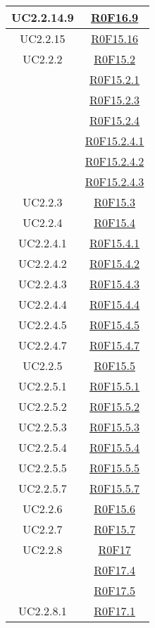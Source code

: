 \documentclass[../AnalisiDeiRequisiti.tex]{subfiles}
\begin{document}
\begin{longtable}{|c|c|}
	UC2.2.14.9 & \hyperlink{R0F16.9}{R0F16.9}\\\hline
	UC2.2.15 & \hyperlink{R0F15.16}{R0F15.16}\\\hline
	UC2.2.2 & \hyperlink{R0F15.2}{R0F15.2}\\& \hyperlink{R0F15.2.1}{R0F15.2.1}\\& \hyperlink{R0F15.2.3}{R0F15.2.3}\\& \hyperlink{R0F15.2.4}{R0F15.2.4}\\& \hyperlink{R0F15.2.4.1}{R0F15.2.4.1}\\& \hyperlink{R0F15.2.4.2}{R0F15.2.4.2}\\& \hyperlink{R0F15.2.4.3}{R0F15.2.4.3}\\\hline
	UC2.2.3 & \hyperlink{R0F15.3}{R0F15.3}\\\hline
	UC2.2.4 & \hyperlink{R0F15.4}{R0F15.4}\\\hline
	UC2.2.4.1 & \hyperlink{R0F15.4.1}{R0F15.4.1}\\\hline
	UC2.2.4.2 & \hyperlink{R0F15.4.2}{R0F15.4.2}\\\hline
	UC2.2.4.3 & \hyperlink{R0F15.4.3}{R0F15.4.3}\\\hline
	UC2.2.4.4 & \hyperlink{R0F15.4.4}{R0F15.4.4}\\\hline
	UC2.2.4.5 & \hyperlink{R0F15.4.5}{R0F15.4.5}\\\hline
	UC2.2.4.7 & \hyperlink{R0F15.4.7}{R0F15.4.7}\\\hline
	UC2.2.5 & \hyperlink{R0F15.5}{R0F15.5}\\\hline
	UC2.2.5.1 & \hyperlink{R0F15.5.1}{R0F15.5.1}\\\hline
	UC2.2.5.2 & \hyperlink{R0F15.5.2}{R0F15.5.2}\\\hline
	UC2.2.5.3 & \hyperlink{R0F15.5.3}{R0F15.5.3}\\\hline
	UC2.2.5.4 & \hyperlink{R0F15.5.4}{R0F15.5.4}\\\hline
	UC2.2.5.5 & \hyperlink{R0F15.5.5}{R0F15.5.5}\\\hline
	UC2.2.5.7 & \hyperlink{R0F15.5.7}{R0F15.5.7}\\\hline
	UC2.2.6 & \hyperlink{R0F15.6}{R0F15.6}\\\hline
	UC2.2.7 & \hyperlink{R0F15.7}{R0F15.7}\\\hline
	UC2.2.8 & \hyperlink{R0F17}{R0F17}\\& \hyperlink{R0F17.4}{R0F17.4}\\& \hyperlink{R0F17.5}{R0F17.5}\\\hline
	UC2.2.8.1 & \hyperlink{R0F17.1}{R0F17.1}\\\hline

\end{longtable}
\end{document}
